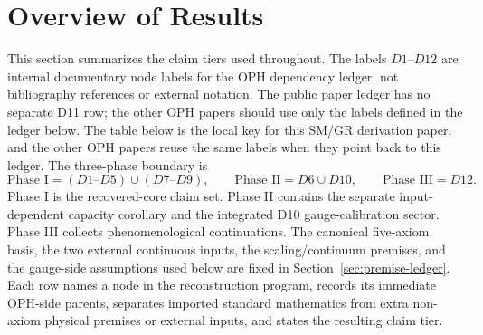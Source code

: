 \documentclass[11pt]{article}
\begin{document}
\section{Overview of Results}

This section summarizes the claim tiers used throughout. The labels \(D1\)--\(D12\) are internal
documentary node labels for the OPH dependency ledger, not bibliography references or external
notation. The public paper ledger has no separate D11 row; the other OPH papers should use
only the labels defined in the ledger below. The table below is the local key for this
SM/GR derivation paper, and the other OPH papers reuse the same labels when they point back to this ledger. The
three-phase boundary is
\[
\text{Phase I}=(D1\text{--}D5)\cup(D7\text{--}D9),\qquad
\text{Phase II}=D6\cup D10,\qquad
\text{Phase III}=D12.
\]
Phase I is the recovered-core claim set. Phase II contains the separate input-dependent capacity corollary and the integrated D10 gauge-calibration sector. Phase III collects phenomenological continuations. The canonical five-axiom basis, the two external continuous inputs, the scaling/continuum premises, and the gauge-side assumptions used below are fixed in Section~\ref{sec:premise-ledger}. Each row names a node in the reconstruction program, records its immediate OPH-side parents, separates imported standard mathematics from extra non-axiom physical premises or external inputs, and states the resulting claim tier.
\end{document}
